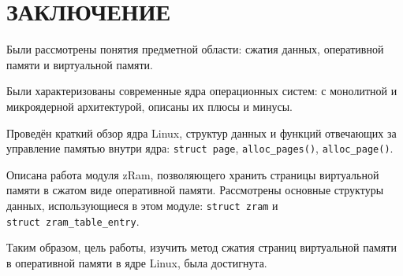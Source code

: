 \section*{ЗАКЛЮЧЕНИЕ}

Были рассмотрены понятия предметной области: сжатия данных, оперативной памяти и виртуальной памяти. 

Были характеризованы современные ядра операционных систем: с монолитной и микроядерной архитектурой, описаны их плюсы и минусы.

Проведён краткий обзор ядра Linux, структур данных и функций отвечающих за управление памятью внутри ядра: \texttt{struct page}, \texttt{alloc\_pages()}, \texttt{alloc\_page()}.

Описана работа модуля zRam, позволяющего хранить страницы виртуальной памяти в сжатом виде оперативной памяти. Рассмотрены основные структуры данных, использующиеся в этом модуле: \texttt{struct zram} и\\ \texttt{struct zram\_table\_entry}.

Таким образом, цель работы, изучить метод сжатия страниц виртуальной памяти в оперативной памяти в ядре Linux, была достигнута.

\pagebreak